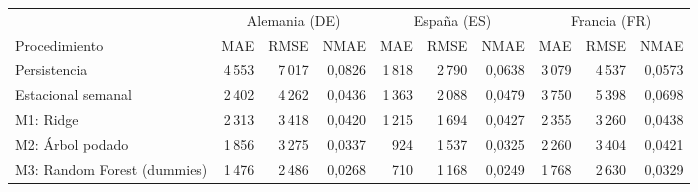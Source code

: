 \begin{tabular}{lrrrrrrrrr}
\toprule
 & \multicolumn{3}{c}{Alemania (DE)} & \multicolumn{3}{c}{España (ES)} & \multicolumn{3}{c}{Francia (FR)} \\
\cmidrule(lr){2-4}\cmidrule(lr){5-7}\cmidrule(lr){8-10}
Procedimiento & MAE & RMSE & NMAE & MAE & RMSE & NMAE & MAE & RMSE & NMAE \\
\midrule
Persistencia & 4\,553 & 7\,017 & 0{,}0826 & 1\,818 & 2\,790 & 0{,}0638 & 3\,079 & 4\,537 & 0{,}0573 \\
Estacional semanal & 2\,402 & 4\,262 & 0{,}0436 & 1\,363 & 2\,088 & 0{,}0479 & 3\,750 & 5\,398 & 0{,}0698 \\
\midrule
M1: Ridge & 2\,313 & 3\,418 & 0{,}0420 & 1\,215 & 1\,694 & 0{,}0427 & 2\,355 & 3\,260 & 0{,}0438 \\
M2: Árbol podado & 1\,856 & 3\,275 & 0{,}0337 & 924 & 1\,537 & 0{,}0325 & 2\,260 & 3\,404 & 0{,}0421 \\
M3: Random Forest (dummies) & 1\,476 & 2\,486 & 0{,}0268 & 710 & 1\,168 & 0{,}0249 & 1\,768 & 2\,630 & 0{,}0329 \\
\bottomrule
\end{tabular}